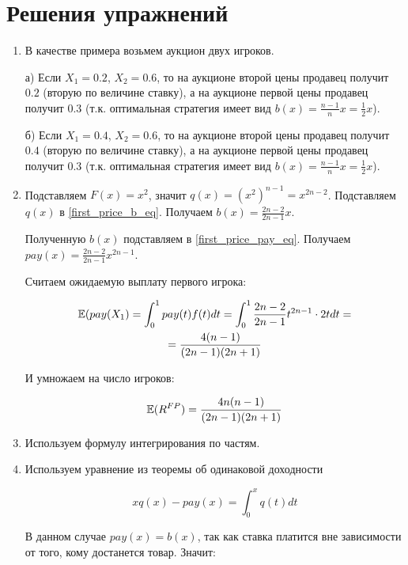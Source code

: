 \section{Решения упражнений}

\begin{enumerate}
\item В качестве примера возьмем аукцион двух игроков.

а) Если $ X_{1}=0.2 $, $ X_{2}=0.6 $, то на аукционе второй цены продавец получит $ 0.2 $ (вторую по величине ставку), а на аукционе первой цены продавец получит $ 0.3 $ (т.к. оптимальная стратегия имеет вид $ b(x)=\frac{n-1}{n}x=\frac{1}{2}x $).

б) Если $ X_{1}=0.4 $, $ X_{2}=0.6 $, то на аукционе второй цены продавец получит $ 0.4 $ (вторую по величине ставку), а на аукционе первой цены продавец получит $ 0.3 $ (т.к. оптимальная стратегия имеет вид $ b(x)=\frac{n-1}{n}x=\frac{1}{2}x $).

\item Подставляем $ F(x)=x^{2} $, значит $ q(x)=(x^{2})^{n-1}=x^{2n-2} $. Подставляем $ q(x) $ в \ref{first_price_b_eq}. Получаем $ b(x)=\frac{2n-2}{2n-1}x $. 

Полученную $ b(x) $ подставляем в \ref{first_price_pay_eq}. Получаем $ pay(x)=\frac{2n-2}{2n-1}x^{2n-1} $. 

Считаем ожидаемую выплату первого игрока:

\begin{multline}
\mathbb{E}(pay(X_{1})=\int_{0}^{1}pay(t)f(t)dt=\int_{0}^{1}\frac{2n-2}{2n-1}t^{2n-1}\cdot 2tdt=\\
=\frac{4(n-1)}{(2n-1)(2n+1)}
\end{multline}

И умножаем на число игроков:

\begin{equation}
\mathbb{E}(R^{FP})=\frac{4n(n-1)}{(2n-1)(2n+1)}
\end{equation}

\item Используем формулу интегрирования по частям.


\item Используем уравнение из теоремы об одинаковой доходности

\begin{equation}
xq(x)-pay(x)=\int_{0}^{x}q(t)dt
\end{equation}

В данном случае $ pay(x)=b(x) $, так как ставка платится вне зависимости от того, кому достанется товар. Значит: 


\end{enumerate}
